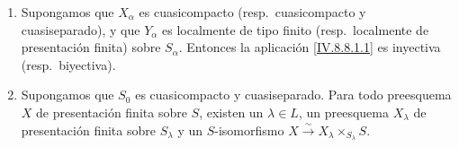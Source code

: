 \begin{theorem}[8.8.2]
\begin{enumerate}[label=\textup{(\roman*)}]
\item Supongamos que $X_\alpha$ es cuasicompacto \textup{(resp.}\ cuasicompacto y cuasiseparado\textup{)}, y que $Y_\alpha$ es localmente de tipo finito \textup{(resp.}\ localmente de presentación finita\textup{)} sobre $S_\alpha$.
Entonces la aplicación \eqref{IV.8.8.1.1} es inyectiva \textup{(resp.}\ biyectiva\textup{)}.
\item Supongamos que $S_0$ es cuasicompacto y cuasiseparado.
Para todo preesquema $X$ de presentación finita sobre $S$, existen un $\lambda\in L$, un preesquema $X_\lambda$ de presentación finita sobre $S_\lambda$ y un $S$-isomorfismo $X\xrightarrow{\sim}X_\lambda\times_{S_\lambda}S$.
\end{enumerate}
\end{theorem}

